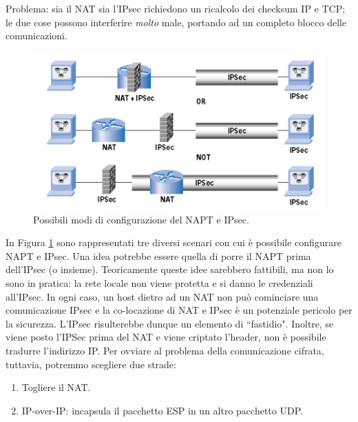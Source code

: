 Problema: sia il NAT sia l'IPsec richiedono un ricalcolo dei checksum IP e TCP; le due cose possono interferire \textit{molto} male, portando ad un completo blocco delle comunicazioni.
\begin{figure}[htbp]
	\centering
	\includegraphics[scale = 0.7]{images/NAPT-IPsec}
	\caption{Possibili modi di configurazione del NAPT e IPsec.}
	\label{img:NAPT-IPsec}
\end{figure}

In Figura \ref{img:NAPT-IPsec} sono rappresentati tre diversi scenari con cui è possibile configurare NAPT e IPsec. Una idea potrebbe essere quella di porre il NAPT prima dell'IPsec (o insieme). Teoricamente queste idee sarebbero fattibili, ma non lo sono in pratica: la rete locale non viene protetta e si danno le credenziali all'IPsec. In ogni caso, un host dietro ad un NAT non può cominciare una comunicazione IPsec e la co-locazione di NAT e IPsec è un potenziale pericolo per la sicurezza. L'IPsec risulterebbe dunque un elemento di \textquotedblleft fastidio". Inoltre, se viene posto l'IPSec prima del NAT e viene criptato l'header, non è possibile tradurre l'indirizzo IP. Per ovviare al problema della comunicazione cifrata, tuttavia, potremmo scegliere due strade:
\begin{enumerate}
	\item Togliere il NAT.
	\item IP-over-IP: incapsula il pacchetto ESP in un altro pacchetto UDP.
\end{enumerate}

